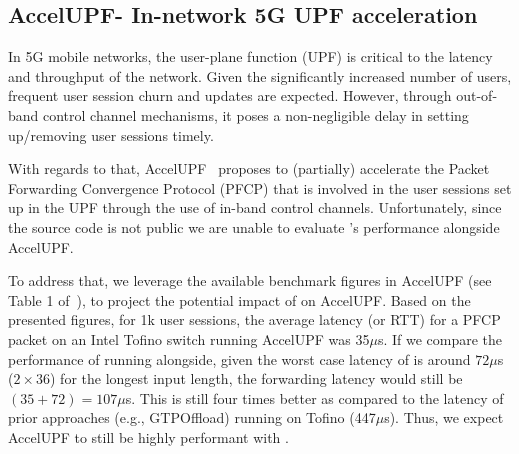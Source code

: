 
% 
% 

\subsection{AccelUPF- In-network 5G UPF acceleration}

In 5G mobile networks, the user-plane function (UPF) is critical to the latency and throughput of the network. 
Given the significantly increased number of users, frequent user session churn and updates are expected.
However, through out-of-band control channel mechanisms, it poses a non-negligible delay in setting up/removing user sessions timely.

With regards to that, AccelUPF~\cite{bose2022accelupf} proposes to (partially) accelerate the Packet Forwarding Convergence Protocol (PFCP) that is involved in the user sessions set up in the UPF through the use of in-band control channels.
Unfortunately, since the source code is not public we are unable to evaluate {\sysname}'s performance alongside AccelUPF.

To address that, we leverage the available benchmark figures in AccelUPF (see Table 1 of~\cite{bose2022accelupf}), to project the potential impact of \sysname on AccelUPF.
Based on the presented figures, for 1k user sessions, the average latency (or RTT) for a PFCP packet on an Intel Tofino switch running AccelUPF was 35$\mu$s.
If we compare the performance of \sysname running alongside, given the worst case latency of \sysname is around $72 \mu$s ($2 \times 36$) for the longest input length, 
the forwarding latency would still be $(35 + 72)=107\mu$s.
This is still four times better as compared to the latency of prior approaches (e.g., GTPOffload) running on Tofino (447$\mu$s).
Thus, we expect AccelUPF to still be highly performant with \sysname.

% 

